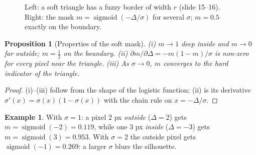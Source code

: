 \documentclass[11pt,a4paper]{article}
\DeclareMathOperator{\sigmoid}{sigmoid}
\theoremstyle{definition}
\newtheorem{example}[definition]{Example}
\theoremstyle{plain}
\newtheorem{proposition}[definition]{Proposition}
\theoremstyle{remark}
\begin{document}
\begin{figure}[htbp]
\centering
{}
\caption{Left: a soft triangle has a fuzzy border of width $r$ (slide 15--16). Right: the mask $m=\sigmoid(-\Delta/\sigma)$ for several $\sigma$; $m=0.5$ exactly on the boundary.}
\end{figure}

\begin{proposition}[Properties of the soft mask]
(i) $m\to1$ deep inside and $m\to0$ far outside; $m=\tfrac12$ on the boundary. (ii) $\partial m/\partial\Delta=-m(1-m)/\sigma$ is non-zero for every pixel near the triangle. (iii) As $\sigma\to0$, $m$ converges to the hard indicator of the triangle.
\end{proposition}
\begin{proof}
(i)--(iii) follow from the shape of the logistic function; (ii) is its derivative $\sigma'(x)=\sigma(x)(1-\sigma(x))$ with the chain rule on $x=-\Delta/\sigma$.
\end{proof}

\begin{example}
With $\sigma=1$: a pixel 2 px \emph{outside} ($\Delta=2$) gets $m=\sigmoid(-2)=0.119$, while one 3 px \emph{inside} ($\Delta=-3$) gets $m=\sigmoid(3)=0.953$. With $\sigma=2$ the outside pixel gets $\sigmoid(-1)=0.269$: a larger $\sigma$ blurs the silhouette.
\end{example}
\end{document}

